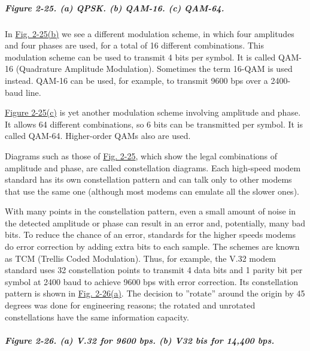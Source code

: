 \documentclass[b5paper,11pt]{memoir}
\begin{document}
\subparagraph[Figure 2-25. (a) QPSK. (b) QAM-16. (c)
QAM-64.]{\texorpdfstring{\protect\hypertarget{0130661023_ch02lev1sec5.htmlux5cux23ch02fig25}{}{}Figure
2-25. (a) QPSK. (b) QAM-16. (c)
QAM-64.}{Figure 2-25. (a) QPSK. (b) QAM-16. (c) QAM-64.}}


In
\protect\hyperlink{0130661023_ch02lev1sec5.htmlux5cux23ch02fig25}{Fig.
2-25(b)} we see a different modulation scheme, in which four amplitudes
and four phases are used, for a total of 16 different combinations. This
modulation scheme can be used to transmit 4 bits per symbol. It is
called {QAM-16} ({Quadrature Amplitude Modulation}). Sometimes the term
{16-QAM} is used instead. QAM-16 can be used, for example, to transmit
9600 bps over a 2400-baud line.

\protect\hyperlink{0130661023_ch02lev1sec5.htmlux5cux23ch02fig25}{Figure
2-25(c)} is yet another modulation scheme involving amplitude and phase.
It allows 64 different combinations, so 6 bits can be transmitted per
symbol. It is called {QAM-64}. Higher-order QAMs also are used.

Diagrams such as those of
\protect\hyperlink{0130661023_ch02lev1sec5.htmlux5cux23ch02fig25}{Fig.
2-25}, which show the legal combinations of amplitude and phase, are
called {constellation diagrams}. Each high-speed modem standard has its
own constellation pattern and can talk only to other modems that use the
same one (although most modems can emulate all the slower ones).

With many points in the constellation pattern, even a small amount of
noise in the detected amplitude or phase can result in an error and,
potentially, many bad bits. To reduce the chance of an error, standards
for the higher speeds modems do error correction by adding extra bits to
each sample. The schemes are known as {TCM} ({Trellis Coded
Modulation}). Thus, for example, the V.32 modem standard uses 32
constellation points to transmit 4 data bits and 1 parity bit per symbol
at 2400 baud to achieve 9600 bps with error correction. Its
constellation pattern is shown in
\protect\hyperlink{0130661023_ch02lev1sec5.htmlux5cux23ch02fig26}{Fig.
2-26(a)}. The decision to ''rotate'' around the origin by 45 degrees was
done for engineering reasons; the rotated and unrotated constellations
have the same information capacity.

\subparagraph[Figure 2-26. (a) V.32 for 9600 bps. (b) V32 bis for 14,400
bps.]{\texorpdfstring{\protect\hypertarget{0130661023_ch02lev1sec5.htmlux5cux23ch02fig26}{}{}Figure
2-26. (a) V.32 for 9600 bps. (b) V32 bis for 14,400
bps.}{Figure 2-26. (a) V.32 for 9600 bps. (b) V32 bis for 14,400 bps.}}
\end{document}
